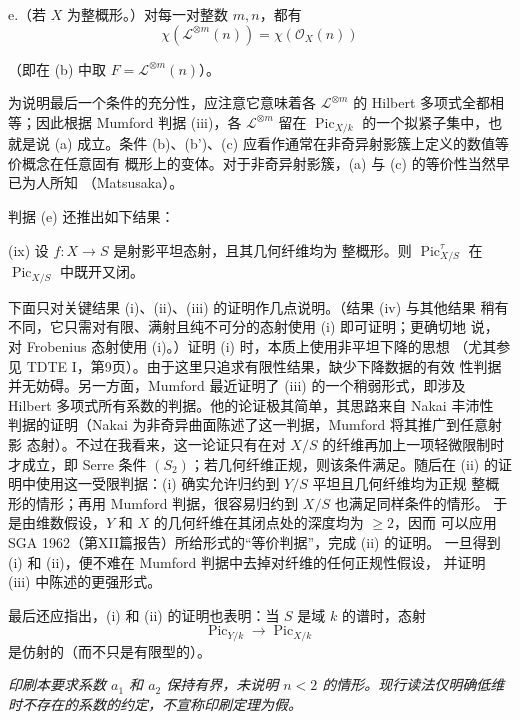 \noindent e.（若 $X$ 为整概形。）对每一对整数 $m,n$，都有
\[
\chi(\mathcal L^{\otimes m}(n))=\chi(\mathcal O_X(n))
\]

（即在 (b) 中取 $F=\mathcal L^{\otimes m}(n)$）。

为说明最后一个条件的充分性，应注意它意味着各
$\mathcal L^{\otimes m}$ 的 Hilbert 多项式全都相等；因此根据 Mumford
判据 (iii)，各 $\mathcal L^{\otimes m}$ 留在
$\operatorname{Pic}_{X/k}$ 的一个拟紧子集中，也就是说 (a) 成立。条件
(b)、(b')、(c) 应看作通常在非奇异射影簇上定义的数值等价概念在任意固有
概形上的变体。对于非奇异射影簇，(a) 与 (c) 的等价性当然早已为人所知
（Matsusaka）。

判据 (e) 还推出如下结果：

\medskip
\noindent(ix) 设 $f:X\longrightarrow S$ 是射影平坦态射，且其几何纤维均为
整概形。则 $\operatorname{Pic}_{X/S}^\tau$ 在
$\operatorname{Pic}_{X/S}$ 中既开又闭。

下面只对关键结果 (i)、(ii)、(iii) 的证明作几点说明。（结果 (iv) 与其他结果
稍有不同，它只需对有限、满射且纯不可分的态射使用 (i) 即可证明；更确切地
说，对 Frobenius 态射使用 (i)。）证明 (i) 时，本质上使用非平坦下降的思想
（尤其参见 TDTE I，第9页）。由于这里只追求有限性结果，缺少下降数据的有效
性判据并无妨碍。另一方面，Mumford 最近证明了 (iii) 的一个稍弱形式，即涉及
Hilbert 多项式所有系数的判据。他的论证极其简单，其思路来自 Nakai 丰沛性
判据的证明（Nakai 为非奇异曲面陈述了这一判据，Mumford 将其推广到任意射影
态射）。不过在我看来，这一论证只有在对 $X/S$ 的纤维再加上一项轻微限制时
才成立，即 Serre 条件 $(S_2)$；若几何纤维正规，则该条件满足。随后在 (ii)
的证明中使用这一受限判据：(i) 确实允许归约到 $Y/S$ 平坦且几何纤维均为正规
整概形的情形；再用 Mumford 判据，很容易归约到 $X/S$ 也满足同样条件的情形。
于是由维数假设，$Y$ 和 $X$ 的几何纤维在其闭点处的深度均为 $\geq2$，因而
可以应用 SGA 1962（第XII篇报告）所给形式的“等价判据”，完成 (ii) 的证明。
一旦得到 (i) 和 (ii)，便不难在 Mumford 判据中去掉对纤维的任何正规性假设，
并证明 (iii) 中陈述的更强形式。

最后还应指出，(i) 和 (ii) 的证明也表明：当 $S$ 是域 $k$ 的谱时，态射
\[
\operatorname{Pic}_{Y/k}\longrightarrow\operatorname{Pic}_{X/k}
\]
是仿射的（而不只是有限型的）。

\par\smallskip
\begingroup\footnotesize
\noindent\textit{印刷本要求系数 $a_1$ 和 $a_2$ 保持有界，未说明 $n<2$ 的情形。现行读法仅明确低维时不存在的系数的约定，不宣称印刷定理为假。}\par
\endgroup
